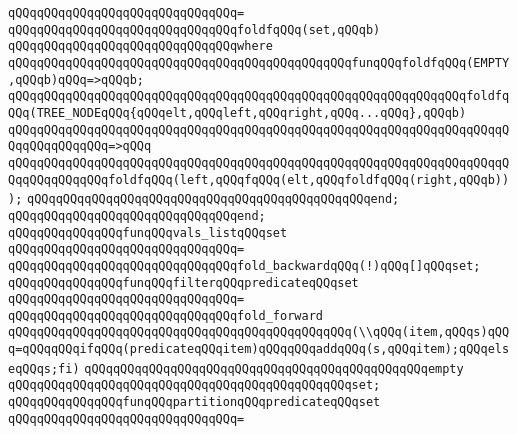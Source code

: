 \verb|qQQqqQQqqQQqqQQqqQQqqQQqqQQqqQQq=|\newline
\verb|qQQqqQQqqQQqqQQqqQQqqQQqqQQqqQQqfoldfqQQq(set,qQQqb)|\newline
\verb|qQQqqQQqqQQqqQQqqQQqqQQqqQQqqQQqwhere|\newline
\verb|qQQqqQQqqQQqqQQqqQQqqQQqqQQqqQQqqQQqqQQqqQQqqQQqfunqQQqfoldfqQQq(EMPTY,qQQqb)qQQq=>qQQqb;|\newline
\verb|qQQqqQQqqQQqqQQqqQQqqQQqqQQqqQQqqQQqqQQqqQQqqQQqqQQqqQQqqQQqqQQqfoldfqQQq(TREE_NODEqQQq{qQQqelt,qQQqleft,qQQqright,qQQq...qQQq},qQQqb)|\newline
\verb|qQQqqQQqqQQqqQQqqQQqqQQqqQQqqQQqqQQqqQQqqQQqqQQqqQQqqQQqqQQqqQQqqQQqqQQqqQQqqQQqqQQq=>qQQq|\newline
\verb|qQQqqQQqqQQqqQQqqQQqqQQqqQQqqQQqqQQqqQQqqQQqqQQqqQQqqQQqqQQqqQQqqQQqqQQqqQQqqQQqqQQqfoldfqQQq(left,qQQqfqQQq(elt,qQQqfoldfqQQq(right,qQQqb)));|\newline
\verb|qQQqqQQqqQQqqQQqqQQqqQQqqQQqqQQqqQQqqQQqqQQqqQQqend;|\newline
\verb|qQQqqQQqqQQqqQQqqQQqqQQqqQQqqQQqend;|\newline
\newline
\newline
\verb|qQQqqQQqqQQqqQQqfunqQQqvals_listqQQqset|\newline
\verb|qQQqqQQqqQQqqQQqqQQqqQQqqQQqqQQq=|\newline
\verb|qQQqqQQqqQQqqQQqqQQqqQQqqQQqqQQqfold_backwardqQQq(!)qQQq[]qQQqset;|\newline
\newline
\newline
\verb|qQQqqQQqqQQqqQQqfunqQQqfilterqQQqpredicateqQQqset|\newline
\verb|qQQqqQQqqQQqqQQqqQQqqQQqqQQqqQQq=|\newline
\verb|qQQqqQQqqQQqqQQqqQQqqQQqqQQqqQQqfold_forward|\newline
\verb|qQQqqQQqqQQqqQQqqQQqqQQqqQQqqQQqqQQqqQQqqQQqqQQq(\\qQQq(item,qQQqs)qQQq=qQQqqQQqifqQQq(predicateqQQqitem)qQQqqQQqaddqQQq(s,qQQqitem);qQQqelseqQQqs;fi)|\newline
\verb|qQQqqQQqqQQqqQQqqQQqqQQqqQQqqQQqqQQqqQQqqQQqqQQqempty|\newline
\verb|qQQqqQQqqQQqqQQqqQQqqQQqqQQqqQQqqQQqqQQqqQQqqQQqset;|\newline
\newline
\verb|qQQqqQQqqQQqqQQqfunqQQqpartitionqQQqpredicateqQQqset|\newline
\verb|qQQqqQQqqQQqqQQqqQQqqQQqqQQqqQQq=|\newline
